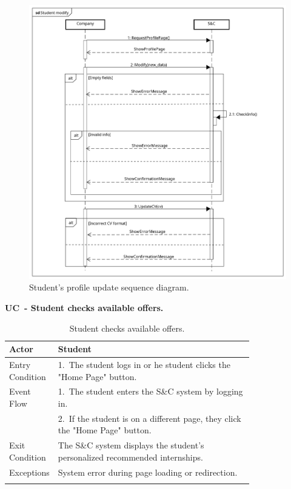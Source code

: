 \begin{figure}[H]
    \centering
    \includegraphics[width=1\linewidth]{Images/Sequence diagrams/Student modify.png}
    \caption{Student's profile update sequence diagram.}
    \label{fig:enter-label}
\end{figure}

\textbf{UC\cuc\  - Student checks available offers.}

\begin{center}
    \renewcommand{\arraystretch}{1.2}
    \begin{longtable}{ l p{0.8\linewidth} } 
        \hline
        Actor & Student \\ \hline
        Entry Condition & 1.\ The student logs in or he student clicks the "Home Page" button. \\ \hline
        Event Flow & 1.\ The student enters the S\&C system by logging in. \\
        & 2.\ If the student is on a different page, they click the "Home Page" button. \\ \hline
        Exit Condition & The S\&C system displays the student's personalized recommended internships. \\ \hline
        Exceptions & System error during page loading or redirection. \\ \hline
        \caption{Student checks available offers.}
        \label{tab:goals_tab}%
    \end{longtable}
\end{center}

